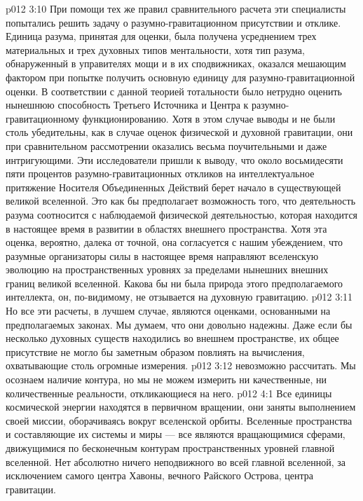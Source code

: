 \vs p012 3:10 \pc {}\bibnobreakspace {} При помощи тех же правил сравнительного расчета эти специалисты попытались решить задачу о разумно\hyp{}гравитационном присутствии и отклике. Единица разума, принятая для оценки, была получена усреднением трех материальных и трех духовных типов ментальности, хотя тип разума, обнаруженный в управителях мощи и в их сподвижниках, оказался мешающим фактором при попытке получить основную единицу для разумно\hyp{}гравитационной оценки. В соответствии с данной теорией тотальности было нетрудно оценить нынешнюю способность Третьего Источника и Центра к разумно\hyp{}гравитационному функционированию. Хотя в этом случае выводы и не были столь убедительны, как в случае оценок физической и духовной гравитации, они при сравнительном рассмотрении оказались весьма поучительными и даже интригующими. Эти исследователи пришли к выводу, что около восьмидесяти пяти процентов разумно\hyp{}гравитационных откликов на интеллектуальное притяжение Носителя Объединенных Действий берет начало в существующей великой вселенной. Это как бы предполагает возможность того, что деятельность разума соотносится с наблюдаемой физической деятельностью, которая находится в настоящее время в развитии в областях внешнего пространства. Хотя эта оценка, вероятно, далека от точной, она согласуется с нашим убеждением, что разумные организаторы силы в настоящее время направляют вселенскую эволюцию на пространственных уровнях за пределами нынешних внешних границ великой вселенной. Какова бы ни была природа этого предполагаемого интеллекта, он, по\hyp{}видимому, не отзывается на духовную гравитацию.
\vs p012 3:11 Но все эти расчеты, в лучшем случае, являются оценками, основанными на предполагаемых законах. Мы думаем, что они довольно надежны. Даже если бы несколько духовных существ находились во внешнем пространстве, их общее присутствие не могло бы заметным образом повлиять на вычисления, охватывающие столь огромные измерения.
\vs p012 3:12 \pc {} невозможно рассчитать. Мы осознаем наличие контура, но мы не можем измерить ни качественные, ни количественные реальности, откликающиеся на него.
\vs p012 4:1 Все единицы космической энергии находятся в первичном вращении, они заняты выполнением своей миссии, оборачиваясь вокруг вселенской орбиты. Вселенные пространства и составляющие их системы и миры --- все являются вращающимися сферами, движущимися по бесконечным контурам пространственных уровней главной вселенной. Нет абсолютно ничего неподвижного во всей главной вселенной, за исключением самого центра Хавоны, вечного Райского Острова, центра гравитации.
